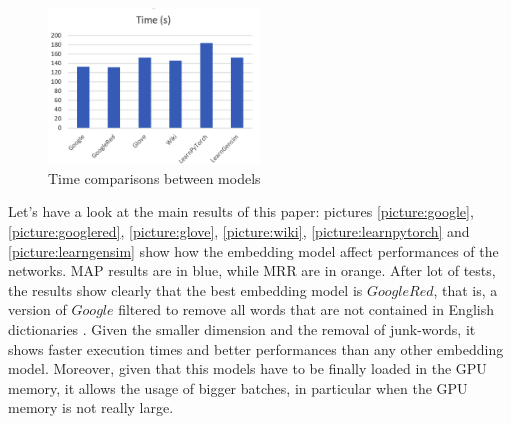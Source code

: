 \documentclass[11pt,a4paper]{article}
\begin{document}
\begin{figure}[ht]
    \centering
    \includegraphics[width=0.5\textwidth]{time.eps}
    \caption{Time comparisons between models}
    \label{picture:time}
\end{figure}

Let's have a look at the main results of this paper: pictures \ref{picture:google}, \ref{picture:googlered}, \ref{picture:glove}, \ref{picture:wiki}, \ref{picture:learnpytorch} and \ref{picture:learngensim} show how the embedding model affect performances of the networks. MAP results are in blue, while MRR are in orange. After lot of tests, the results show clearly that the best embedding model is $GoogleRed$, that is, a version of $Google$ filtered to remove all words that are not contained in English dictionaries \cite{git}. Given the smaller dimension and the removal of junk-words, it shows faster execution times and better performances than any other embedding model. Moreover, given that this models have to be finally loaded in the GPU memory, it allows the usage of bigger batches, in particular when the GPU memory is not really large.
\end{document}
